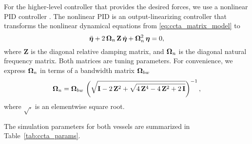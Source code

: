 For the higher-level controller that provides the desired forces, we use a nonlinear PID controller \cite{fossen_handbook_2011}.
The nonlinear PID is an output-linearizing controller that transforms the nonlinear dynamical equations from \eqref{eq:ccta_matrix_model} to
\begin{equation}
    \ddot{\bm{\eta}} + 2\,\bm{\Omega}_n\,\mathbf{Z}\,\dot{\bm{\eta}} + \bm{\Omega}_n^2\,\bm{\eta} = 0,
\end{equation}
where $\mathbf{Z}$ is the diagonal relative damping matrix, and $\bm{\Omega}_n$ is the diagonal natural frequency matrix.
Both matrices are tuning parameters.
For convenience, we express $\bm{\Omega}_n$ in terms of a bandwidth matrix $\bm{\Omega}_{bw}$
\begin{equation}
    \bm{\Omega}_n = \bm{\Omega}_{bw} \, \left(\sqrt{\mathbf{I} - 2\,\mathbf{Z}^2 + \sqrt{4\,\mathbf{Z}^4 - 4\,\mathbf{Z}^2 + 2\,\mathbf{I}}}\right)^{-1},
\end{equation}
where $\sqrt{.}$ is an elementwise square root.

The simulation parameters for both vessels are summarized in Table~\ref{tab:ccta_params}.

